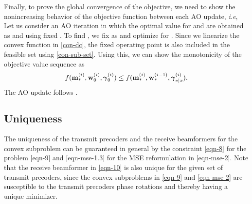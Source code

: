 Finally, to prove the global convergence of the objective, we need to show the nonincreasing behavior of the objective function between each \ac{AO} update, \textit{i.e}, 
Let us consider an \ac{AO} iteration  in which the optimal value for \eqn{\mx} and \eqn{\mz} are obtained as  and  using fixed . To find , we fix \eqn{\mx} as  and optimize for \me{\my}. Since we linearize the convex function in \eqref{con-dc}, the fixed operating point is also included in the feasible set  using \eqref{con-sub-set}. Using this, we can show the monotonicity of the objective value sequence as
\begin{equation*}
f({\mathbf{m}}_{\ast}^{(i)},{\mathbf{w}}_{0}^{(i)},{{\boldsymbol{\gamma}}}_{0}^{(i)}) \leq f({\mathbf{m}}_{\ast}^{(i)},{\mathbf{w}}_{\ast}^{(i-1)},{{\boldsymbol{\gamma}}}_{\ast|x}^{(i)}).
\end{equation*}
The \ac{AO} update follows . %

\subsection{Uniqueness}

The uniqueness of the transmit precoders and the receive beamformers for the convex subproblem can be guaranteed in general by the constraint \eqref{eqn-8} for the problem \eqref{eqn-9} and \eqref{eqn-mse-1.3} for the \ac{MSE} reformulation in \eqref{eqn-mse-2}. Note that the receive beamformer  in \eqref{eqn-10} is also unique for the given set of transmit precoders, since the convex subproblems in \eqref{eqn-9} and \eqref{eqn-mse-2} are susceptible to the transmit precoders phase rotations and thereby having a unique minimizer. 

